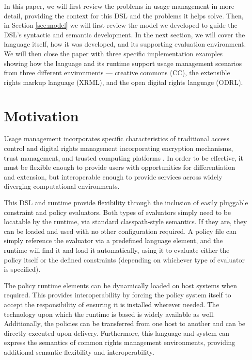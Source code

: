 \documentclass{acm_proc_article-sp}
\begin{document}
In this paper, we will first review the problems in usage management in more detail, providing the context for this DSL and the problems it helps solve.  Then, in Section \ref{sec:model} we will first review the model we developed to guide the DSL's syntactic and semantic development. In the next section, we will cover the language itself, how it was developed, and its supporting evaluation environment.  We will then close the paper with three specific implementation examples showing how the language and its runtime support usage management scenarios from three different environments --- creative commons (CC), the extensible rights markup language (XRML), and the open digital rights language (ODRL).

\section{Motivation}\label{sec:motivation}
Usage management incorporates specific characteristics of traditional access control and digital rights management incorporating encryption mechanisms, trust management, and trusted computing platforms \cite{Jamkhedkar:2010:IUM:1866870.1866885}.  In order to be effective, it must be flexible enough to provide users with opportunities for differentiation and extension, but interoperable enough to provide services across widely diverging computational environments.

This DSL and runtime provide flexibility through the inclusion of easily pluggable constraint and policy evaluators.  Both types of evaluators simply need to be locatable by the runtime, via standard classpath-style semantics.  If they are, they can be loaded and used with no other configuration required.  A policy file can simply reference the evaluator via a predefined language element, and the runtime will find it and load it automatically, using it to evaluate either the policy itself or the defined constraints (depending on whichever type of evaluator is specified).

The policy runtime elements can be dynamically loaded on host systems when required.  This provides interoperability by forcing the policy system itself to accept the responsibility of ensuring it is installed wherever needed.  The technology upon which the runtime is based is widely available as well.  Additionally, the policies can be transferred from one host to another and can be directly executed upon delivery.  Furthermore, this language and system can express the semantics of common rights management environments, providing additional semantic flexibility and interoperability.
\end{document}
